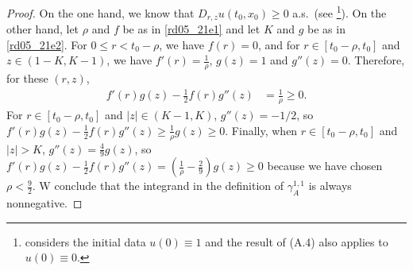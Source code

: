 \documentclass[12pt,a4paper]{article}
\newcommand{\<}{\langle}
\renewcommand{\>}{\rangle}
\begin{document}
 \begin{proof}
 On the one hand, we know that $D_{r,z}u(t_0,x_0)\ge 0$ a.s.~(see \cite[(A.4)]{CKNP23}\footnote{\cite{CKNP23} considers the initial data $u(0)\equiv1$ and the result of (A.4) also applies to $u(0)\equiv0$.}). On the other hand, let $\rho$ and $f$ be as in \eqref{rd05_21e1} and let $K$ and $g$ be as in \eqref{rd05_21e2}.  For $0\leq r < t_0 - \rho$, we have $f(r) = 0$, and for $r \in [t_0-\rho, t_0]$ and $z \in  (1-K, K-1)$,  we have $f'(r)=\frac{1}{\rho}$, $g(z) = 1$ and $g''(z) = 0$. Therefore, for these $(r, z)$,
 \begin{align*}
     f'(r)g(z)-\frac 12 f(r) g''(z) %
 &= \frac 1 \rho %
     \ge 0.
  \end{align*}
For $r \in [t_0-\rho, t_0]$ and $\vert z \vert \in (K-1, K)$, $g''(z) = -1/2$, so $f'(r)g(z)-\frac 12 f(r) g''(z) \geq \frac 1 \rho g(z) \geq 0$. Finally, when  $r \in [t_0-\rho, t_0]$ and $\vert z \vert > K$, $g''(z) = \frac 4 9 g(z)$, so $f'(r)g(z)-\frac 12 f(r) g''(z) = \left( \frac 1 \rho - \frac 2 9 \right) g(z) \geq 0$ because we have chosen $\rho < \frac 9 2$. W conclude that the integrand in the definition of $\gamma_A^{1,1}$ is always nonnegative.


\end{proof}
\end{document}
